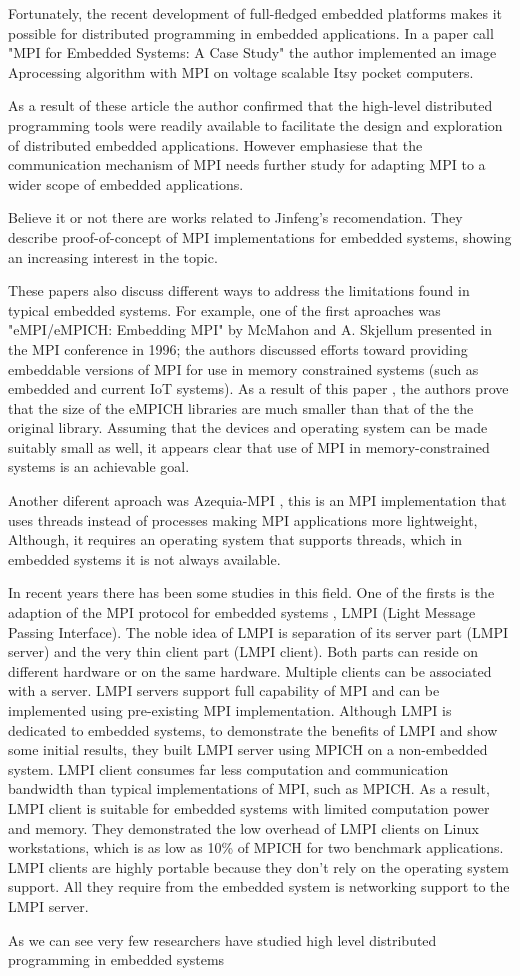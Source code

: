 Fortunately, the recent development of full-fledged embedded platforms makes 
it possible for distributed programming in embedded applications. In a paper
call "MPI for Embedded Systems: A Case Study" the author implemented an image
Aprocessing algorithm with MPI on voltage scalable Itsy pocket computers. 

As a result of these article the author confirmed that the high-level distributed 
programming tools were readily available to facilitate the design and 
exploration of distributed embedded applications. However emphasiese that the 
communication mechanism of MPI needs further study for adapting MPI to a wider 
scope of embedded applications.

Believe it or not there are works 
\cite{Saldana} \cite{Gallego} \cite{McMahon} related to Jinfeng's
recomendation. They describe proof-of-concept of MPI implementations for 
embedded systems, showing an increasing interest in the topic. 

These papers also discuss different ways to address the limitations found in 
typical embedded systems. For example, one of the first aproaches was 
"eMPI/eMPICH: Embedding MPI" by
McMahon and A. Skjellum presented in the MPI conference in 1996; the authors 
discussed efforts toward providing embeddable versions of MPI for use in 
memory constrained systems (such as embedded and
current IoT systems). As a result of this paper , the authors prove that the
size of the eMPICH libraries are much smaller than that of the
the original library. Assuming that the devices  and operating system
can be made suitably small as well, it appears clear that use of MPI in
memory-constrained systems is an achievable goal.

Another diferent aproach was Azequia-MPI \cite{Gallego}, this is an MPI 
implementation that uses threads instead of processes making MPI applications 
more lightweight, Although, it requires an operating system that supports 
threads, which in embedded systems it is not always available. 

In recent years there has been some studies in this field. One of the
firsts is the adaption of the MPI protocol for embedded systems , LMPI
\cite{Liu} (Light Message Passing Interface). The noble idea of LMPI is
separation of its server part (LMPI server) and the very thin client part (LMPI
client). Both parts can reside on different hardware or on the same hardware.
Multiple clients can be associated with a server. LMPI servers support full
capability of MPI and can be implemented using pre-existing MPI implementation.
Although LMPI is dedicated to embedded systems, to demonstrate the benefits of
LMPI and show some initial results, they built LMPI server using MPICH on a
non-embedded system. LMPI client consumes far less computation and
communication
bandwidth than typical implementations of MPI, such as MPICH. As a result, LMPI
client is suitable for embedded systems with limited computation power and
memory. They demonstrated the low overhead of LMPI clients on Linux
workstations, which is as low as 10\% of MPICH for two benchmark applications.
LMPI clients are highly portable because they don't rely on the operating
system
support. All they require from the embedded system is networking support to the
LMPI server.

As we can see very few researchers have studied high level distributed programming
in embedded systems

\newpage

\clearpage
